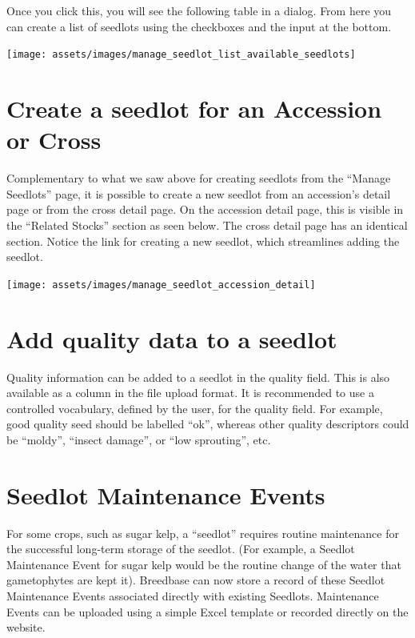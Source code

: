 \documentclass[
  12pt,
]{book}
\begin{document}
Once you click this, you will see the following table in a dialog. From here you can create a list of seedlots using the checkboxes and the input at the bottom.

\begin{center}\texttt{[image: assets/images/manage\_seedlot\_list\_available\_seedlots]} \end{center}

\hypertarget{create-a-seedlot-for-an-accession-or-cross}{%
\section{Create a seedlot for an Accession or Cross}\label{create-a-seedlot-for-an-accession-or-cross}}

Complementary to what we saw above for creating seedlots from the ``Manage Seedlots'' page, it is possible to create a new seedlot from an accession's detail page or from the cross detail page. On the accession detail page, this is visible in the ``Related Stocks'' section as seen below. The cross detail page has an identical section. Notice the link for creating a new seedlot, which streamlines adding the seedlot.

\begin{center}\texttt{[image: assets/images/manage\_seedlot\_accession\_detail]} \end{center}

\hypertarget{add-quality-data-to-a-seedlot}{%
\section{Add quality data to a seedlot}\label{add-quality-data-to-a-seedlot}}

Quality information can be added to a seedlot in the quality field. This is also available as a column in the file upload format. It is recommended to use a controlled vocabulary, defined by the user, for the quality field. For example, good quality seed should be labelled ``ok'', whereas other quality descriptors could be ``moldy'', ``insect damage'', or ``low sprouting'', etc.

\hypertarget{seedlot-maintenance-events}{%
\section{Seedlot Maintenance Events}\label{seedlot-maintenance-events}}

For some crops, such as sugar kelp, a ``seedlot'' requires routine maintenance for the successful long-term storage of the seedlot. (For example, a Seedlot Maintenance Event for sugar kelp would be the routine change of the water that gametophytes are kept it). Breedbase can now store a record of these Seedlot Maintenance Events associated directly with existing Seedlots. Maintenance Events can be uploaded using a simple Excel template or recorded directly on the website.
\end{document}
